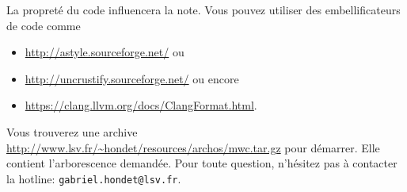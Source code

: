\documentclass{exam}
\begin{document}
La propreté du code influencera la note. Vous pouvez utiliser des
embellificateurs de code comme
\begin{itemize}
  \item \url{http://astyle.sourceforge.net/} ou
  \item \url{http://uncrustify.sourceforge.net/} ou encore
  \item \url{https://clang.llvm.org/docs/ClangFormat.html}.
\end{itemize}

Vous trouverez une archive
\url{http://www.lsv.fr/~hondet/resources/archos/mwc.tar.gz} pour
démarrer. Elle contient l'arborescence demandée.
Pour toute question, n'hésitez pas \`a contacter la hotline:
\texttt{gabriel.hondet@lsv.fr}.
\end{document}
